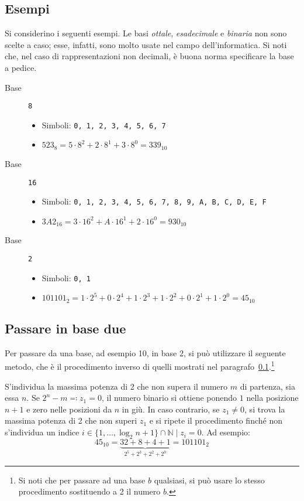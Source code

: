 		\subsection{Esempi}
		\label{subsec:BasiExamp}
Si considerino i seguenti esempi. Le basi \emph{ottale}, \emph{esadecimale} e \emph{binaria} non sono scelte a caso; esse, infatti, sono molto usate nel campo dell'informatica. Si noti che, nel caso di rappresentazioni non decimali, è buona norma specificare la base a pedice.
\begin{description}
\item[Base] \lstinline!8!
	\begin{itemize}
		\item
Simboli: \lstinline!0, 1, 2, 3, 4, 5, 6, 7!
		\item
$523_8=5\cdot8^2+2\cdot8^1+3\cdot8^0=339_{10}$
	\end{itemize}
\item[Base] \lstinline!16!
	\begin{itemize}
		\item
Simboli: \lstinline!0, 1, 2, 3, 4, 5, 6, 7, 8, 9, A, B, C, D, E, F!
		\item
$3A2_{16}=3\cdot16^2+A\cdot16^1+2\cdot16^0=930_{10}$
	\end{itemize}
\item[Base] \lstinline!2!
	\begin{itemize}
		\item
Simboli: \lstinline!0, 1!
		\item
$101101_{2}=1\cdot2^5+0\cdot2^4+1\cdot2^3+1\cdot2^2+0\cdot2^1+1\cdot2^0=45_{10}$
	\end{itemize}
\end{description}

		\subsection{Passare in base due}

Per passare da una base, ad esempio \num{10}, in base \num{2}, si può utilizzare il seguente metodo, che è il procedimento inverso di quelli mostrati nel paragrafo~\ref{subsec:BasiExamp}.\footnote{Si noti che per passare ad una base $b$ qualsiasi, si può usare lo stesso procedimento sostituendo a \num{2} il numero $b$.}

S'individua la massima potenza di \num{2} che non supera il numero $m$ di partenza, sia essa $n$.
Se $2^n-m\eqqcolon z_1=0$, il numero binario si ottiene ponendo $1$ nella posizione $n+1$ e zero nelle posizioni da $n$ in giù.
In caso contrario, se $z_1\neq0$, si trova la massima potenza di \num{2} che non superi $z_1$ e si ripete il procedimento finché non s'individua un indice $i\in\{1,\dots,\log_2n+1\}\cap\mathbb{N} \mid z_{i}=0$.
Ad esempio:
\[
45_{10}=\underbrace{32+8+4+1}_{2^5+2^3+2^2+2^0}=101101_{2}
\]


